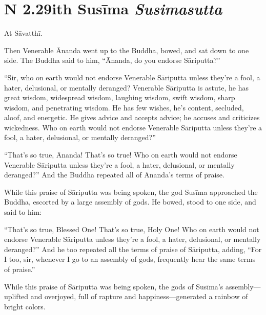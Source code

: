 \documentclass[12pt,openany]{book}%
\newcommand*{\suttatitleacronym}[1]{\smaller[2]{#1}\vspace*{.3em}}
\newcommand*{\suttatitletranslation}[1]{\linebreak{#1}}
\newcommand*{\suttatitleroot}[1]{\linebreak\smaller[2]\itshape{#1}}
\newcommand*{\tocacronym}[1]{\hspace*{-3.3em}{#1}\quad}
\newcommand*{\toctranslation}[1]{#1}
\newcommand*{\tocroot}[1]{(\textit{#1})}
\begin{document}
%
\section*{{\suttatitleacronym SN 2.29}{\suttatitletranslation With Susīma }{\suttatitleroot Susimasutta}}
\addcontentsline{toc}{section}{\tocacronym{SN 2.29} \toctranslation{With Susīma } \tocroot{Susimasutta}}

At \textsanskrit{Sāvatthī}. 

Then Venerable Ānanda went up to the Buddha, bowed, and sat down to one side. The Buddha said to him, “Ānanda, do you endorse \textsanskrit{Sāriputta}?” 

“Sir, who on earth would not endorse Venerable \textsanskrit{Sāriputta} unless they’re a fool, a hater, delusional, or mentally deranged? Venerable \textsanskrit{Sāriputta} is astute, he has great wisdom, widespread wisdom, laughing wisdom, swift wisdom, sharp wisdom, and penetrating wisdom. He has few wishes, he’s content, secluded, aloof, and energetic. He gives advice and accepts advice; he accuses and criticizes wickedness. Who on earth would not endorse Venerable \textsanskrit{Sāriputta} unless they’re a fool, a hater, delusional, or mentally deranged?” 

“That’s so true, Ānanda! That’s so true! Who on earth would not endorse Venerable \textsanskrit{Sāriputta} unless they’re a fool, a hater, delusional, or mentally deranged?” And the Buddha repeated all of Ānanda’s terms of praise. 

While this praise of \textsanskrit{Sāriputta} was being spoken, the god \textsanskrit{Susīma} approached the Buddha, escorted by a large assembly of gods. He bowed, stood to one side, and said to him: 

“That’s so true, Blessed One! That’s so true, Holy One! Who on earth would not endorse Venerable \textsanskrit{Sāriputta} unless they’re a fool, a hater, delusional, or mentally deranged?” And he too repeated all the terms of praise of \textsanskrit{Sāriputta}, adding, “For I too, sir, whenever I go to an assembly of gods, frequently hear the same terms of praise.” 

While this praise of \textsanskrit{Sāriputta} was being spoken, the gods of \textsanskrit{Susīma}’s assembly—uplifted and overjoyed, full of rapture and happiness—generated a rainbow of bright colors. 
\end{document}
